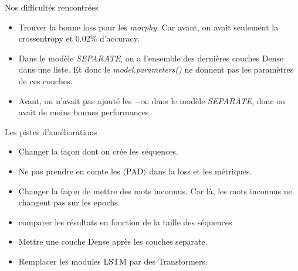 \documentclass[11pt]{beamer}
\begin{document}
\begin{frame}{Nos difficultés rencontrées}
    \begin{itemize}
        \item Trouver la bonne loss pour les \textit{morphy}. Car avant, on avait seulement 
            la crossentropy et 0.02\% d'accuracy.
        \item Dans le modèle \textit{SEPARATE}, on a l'ensemble des dernières couches 
            Dense dans une liste. Et donc le \textit{model.parameters()} ne donnent pas les 
            paramètres de ces couches.
        \item Avant, on n'avait pas ajouté les $-\infty$ dans le modèle \textit{SEPARATE},
            donc on avait de moins bonnes performances
    \end{itemize}
\end{frame}

\begin{frame}{Les pistes d'améliorations}
    \begin{itemize}
        \item Changer la façon dont on crée les séquences.
        \item Ne pas prendre en comte les $\langle$PAD$\rangle$ dans la loss et les métriques.
        \item Changer la façon de mettre des mots inconnus. Car là, les mots inconnus 
            ne changent pas sur les epochs.
        \item comparer les résultats en fonction de la taille des séquences
        \item Mettre une couche Dense après les couches separate.
        \item Remplacer les modules LSTM par des Transformers.
    \end{itemize}
\end{frame}
\end{document}
